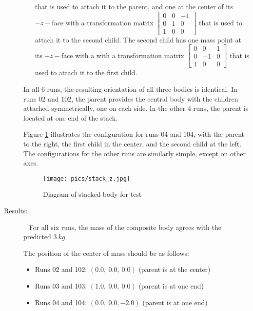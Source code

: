 \begin{description}
\begin{itemize}
 that is used to attach it to the parent, and one at the center of its
 $-z-$face with a transformation matrix $\begin{bmatrix} 0 & 0 & -1 \\ 0 & 1 &
 0 \\ 1 & 0 & 0 \end{bmatrix}$ that is used to attach it to the second child.
 The second child has one mass point at its $+z-$face with a with a
 transformation matrix $\begin{bmatrix} 0 & 0 & 1 \\ 0 & -1 & 0 \\ 1 & 0 & 0
 \end{bmatrix}$ that is used to attach it to the first child.
\end{itemize}

In all 6 runs, the resulting orientation of all three bodies is identical.  In
runs 02 and 102, the parent provides the central body with the children
attached symmetrically, one on each side.  In the other 4 runs, the parent is
located at one end of the stack.

Figure \ref{3_stack_z} illustrates the configuration for runs 04 and 104, with
the parent to the right, the first child in the center, and the second child
at the left.  The configurations for the other runs are similarly simple,
except on other axes.


\begin{figure}[h]
\begin{center}
\texttt{[image: pics/stack\_z.jpg]}
\caption{Diagram of stacked body for test}
\label{3_stack_z}
\end{center}
\end{figure}

\item[Results:]\ \newline
For all six runs, the mass of the composite body agrees with the predicted $3~
kg$.

The position of the center of mass should be as follows:
\begin{itemize}
 \item Runs 02 and 102:  $(0.0,~0.0,~0.0)$ (parent is at the center)
 \item Runs 03 and 103:  $(1.0,~0.0,~0.0)$ (parent is at one end)
 \item Runs 04 and 104:  $(0.0,~0.0,-2.0)$ (parent is at one end)
\end{itemize}


\end{description}
